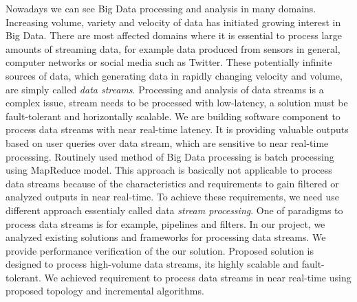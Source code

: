 Nowadays we can see Big Data processing and analysis in many domains. Increasing volume, variety and velocity of data has initiated growing interest in Big Data. There are most affected domains where it is essential to process large amounts of streaming data, for example data produced from sensors in general, computer networks or social media such as Twitter. These potentially infinite sources of data, which generating data in rapidly changing velocity and volume, are simply called \textit{data streams}. Processing and analysis of data streams is a complex issue, stream needs to be processed with low-latency, a solution must be fault-tolerant and horizontally scalable.
We are building software component to process data streams with near real-time latency. It is providing valuable outputs based on user queries over data stream, which are sensitive to near real-time processing. Routinely used method of Big Data processing is batch processing using MapReduce model. This approach is basically not applicable to process data streams because of the characteristics 
and requirements to gain filtered or analyzed outputs in near real-time. To achieve these requirements, we need use different approach essentialy called data \textit{stream processing}. One of paradigms to process data streams is for example, pipelines and filters.
In our project, we analyzed existing solutions and frameworks for processing data streams. We provide performance verification of the our solution. Proposed solution is designed to process high-volume data streams, its highly scalable and fault-tolerant. We achieved requirement to process data streams in near real-time using proposed topology and incremental algorithms.

